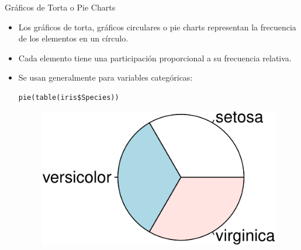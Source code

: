 \documentclass[handout]{beamer}
\begin{document}
\begin{frame}[fragile]{Gráficos de Torta o Pie Charts }
\scriptsize{
\begin{itemize}
 \item Los gráficos de torta, gráficos circulares o pie charts representan la frecuencia de los elementos en un círculo.
 \item Cada elemento tiene una participación proporcional a su frecuencia relativa.
 \item Se usan generalmente para variables categóricas:
 \begin{verbatim}
pie(table(iris$Species))
 \end{verbatim}
 \begin{figure}[h!]
	\centering
	\includegraphics[scale=0.6]{imagenes/piechart.pdf}
	
	
\end{figure} 

\end{itemize}




}
\end{frame}
\end{document}
